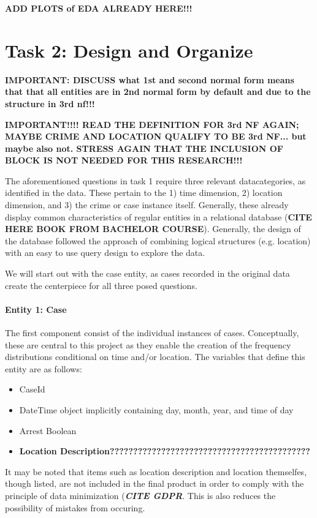 \documentclass[a4paper]{article}
\begin{document}
\textbf{ADD PLOTS of EDA ALREADY HERE!!!}


\section{Task 2: Design and Organize}
\textbf{IMPORTANT: DISCUSS what 1st and second normal form means that that all entities are in 2nd normal form by default and due to the structure in 3rd nf!!!}


\textbf{IMPORTANT!!!! READ THE DEFINITION FOR 3rd NF AGAIN; MAYBE CRIME AND LOCATION QUALIFY TO BE 3rd NF... but maybe also not. STRESS AGAIN THAT THE INCLUSION OF BLOCK IS NOT NEEDED FOR THIS RESEARCH!!!}

The aforementioned questions in task 1 require three relevant datacategories, as identified in the data. These pertain to the 1) time dimension, 2) location dimension, and 3) the crime or case instance itself. Generally, these already display common characteristics of regular entities in a relational database (\textbf{CITE HERE BOOK FROM BACHELOR COURSE}). Generally, the design of the database followed the approach of combining logical structures (e.g. location) with an easy to use query design to explore the data.

We will start out with the case entity, as cases recorded in the original data create the centerpiece for all three posed questions.



\paragraph{Entity 1: Case} The first component consist of the individual instances of cases. Conceptually, these are central to this project as they enable the creation of the frequency distributions conditional on time and/or location. The variables that define this entity are as follows:

\begin{itemize}
  \item CaseId
  \item DateTime object implicitly containing day, month, year, and time of day 
  \item Arrest Boolean  
\item \textbf{Location Description???????????????????????????????????????????}
\end{itemize}
 
It may be noted that items such as location description and location themselfes, though listed, are not included in the final product in order to comply with the principle of data minimization (\textbf{\textit{CITE GDPR}}. This is also reduces the possibility of mistakes from occuring. 
\end{document}

